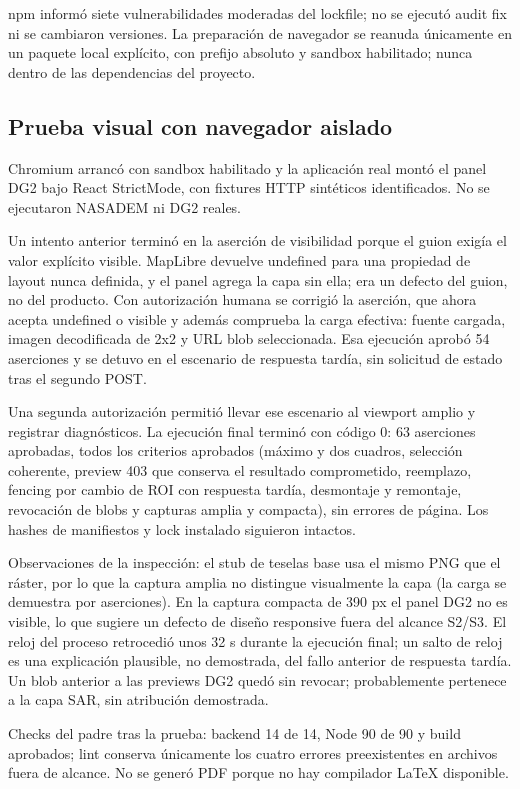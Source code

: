 \documentclass{article}
\begin{document}
npm informó siete vulnerabilidades moderadas del lockfile; no se ejecutó audit fix ni se cambiaron versiones. La preparación de navegador se reanuda únicamente en un paquete local explícito, con prefijo absoluto y sandbox habilitado; nunca dentro de las dependencias del proyecto.

\subsection{Prueba visual con navegador aislado}
Chromium arrancó con sandbox habilitado y la aplicación real montó el panel DG2 bajo React StrictMode, con fixtures HTTP sintéticos identificados. No se ejecutaron NASADEM ni DG2 reales.

Un intento anterior terminó en la aserción de visibilidad porque el guion exigía el valor explícito visible. MapLibre devuelve undefined para una propiedad de layout nunca definida, y el panel agrega la capa sin ella; era un defecto del guion, no del producto. Con autorización humana se corrigió la aserción, que ahora acepta undefined o visible y además comprueba la carga efectiva: fuente cargada, imagen decodificada de 2x2 y URL blob seleccionada. Esa ejecución aprobó 54 aserciones y se detuvo en el escenario de respuesta tardía, sin solicitud de estado tras el segundo POST.

Una segunda autorización permitió llevar ese escenario al viewport amplio y registrar diagnósticos. La ejecución final terminó con código 0: 63 aserciones aprobadas, todos los criterios aprobados (máximo y dos cuadros, selección coherente, preview 403 que conserva el resultado comprometido, reemplazo, fencing por cambio de ROI con respuesta tardía, desmontaje y remontaje, revocación de blobs y capturas amplia y compacta), sin errores de página. Los hashes de manifiestos y lock instalado siguieron intactos.

Observaciones de la inspección: el stub de teselas base usa el mismo PNG que el ráster, por lo que la captura amplia no distingue visualmente la capa (la carga se demuestra por aserciones). En la captura compacta de 390 px el panel DG2 no es visible, lo que sugiere un defecto de diseño responsive fuera del alcance S2/S3. El reloj del proceso retrocedió unos 32 s durante la ejecución final; un salto de reloj es una explicación plausible, no demostrada, del fallo anterior de respuesta tardía. Un blob anterior a las previews DG2 quedó sin revocar; probablemente pertenece a la capa SAR, sin atribución demostrada.

Checks del padre tras la prueba: backend 14 de 14, Node 90 de 90 y build aprobados; lint conserva únicamente los cuatro errores preexistentes en archivos fuera de alcance. No se generó PDF porque no hay compilador LaTeX disponible.
\end{document}
